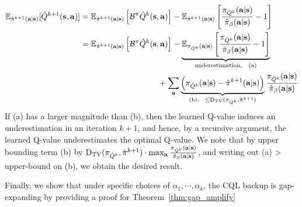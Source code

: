 \begin{align*}
    \mathbb{E}_{\hat{\pi}^{k+1}(\mathbf{a}|\mathbf{s})}[\hat{Q}^{k+1}(\mathbf{s}, \mathbf{a})] &=  \mathbb{E}_{\hat{\pi}^{k+1}(\mathbf{a}|\mathbf{s})}\left[ \mathcal{B}^\pi \hat{Q}^k (\mathbf{s}, \mathbf{a}) \right] - \mathbb{E}_{\hat{\pi}^{k+1}(\mathbf{a}|\mathbf{s})}\left[ \frac{\pi_{\hat{Q}^k}(\mathbf{a} | \mathbf{s})}{\hat{\pi}_\beta(\mathbf{a}|\mathbf{s})} -1 \right]\\
    &= \mathbb{E}_{\hat{\pi}^{k+1}(\mathbf{a}|\mathbf{s})}\left[ \mathcal{B}^\pi \hat{Q}^k (\mathbf{s}, \mathbf{a}) \right] - \underbrace{\mathbb{E}_{\pi_{\hat{Q}^k}(\mathbf{a} | \mathbf{s})}\left[ \frac{\pi_{\hat{Q}^k}(\mathbf{a} | \mathbf{s})}{\hat{\pi}_\beta(\mathbf{a}|\mathbf{s})} -1 \right]}_{\text{underestimation, ~~(a)}}\\
    &~~~~~~~~~~~~~~~~~~~~~~~~~~~~~+ \sum_{\mathbf{a}} \underbrace{\left(\pi_{\hat{Q}^k}(\mathbf{a} | \mathbf{s}) - \hat{\pi}^{k+1}(\mathbf{a}|\mathbf{s}) \right)}_{\text{(b),}~~{\leq \mathrm{D_{TV}}(\pi_{\hat{Q}^k}, \hat{\pi}^{k+1})}} \frac{\pi_{\hat{Q}^k}(\mathbf{a} | \mathbf{s})}{\hat{\pi}_\beta(\mathbf{a}|\mathbf{s})}
\end{align*}
If (a) has a larger magnitude than (b), then the learned Q-value induces an underestimation in an iteration $k+1$, and hence, by a recursive argument, the learned Q-value underestimates the optimal Q-value. We note that by upper bounding term (b) by $\mathrm{D_{TV}}(\pi_{\hat{Q}^k}, \hat{\pi}^{k+1}) \cdot \max_{\mathbf{a}} \frac{\pi_{\hat{Q}^k}(\mathbf{a} | \mathbf{s})}{\hat{\pi}_\beta(\mathbf{a}|\mathbf{s})}$, and writing out (a) > upper-bound on (b), we obtain the desired result.


Finally, we show that under specific choices of $\alpha_1, \cdots, \alpha_k$, the CQL backup is gap-expanding by providing a proof for Theorem~\ref{thm:gap_amplify}

